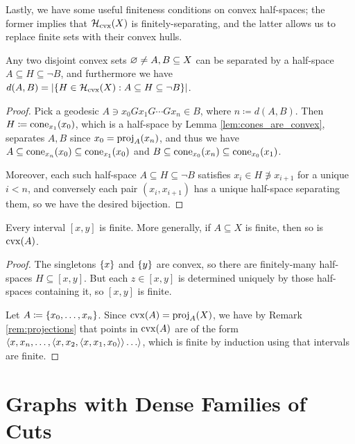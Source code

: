 \documentclass[reqno]{amsart}
\begin{document}
    Lastly, we have some useful finiteness conditions on convex half-spaces; the former implies that $\mc{H}_\mathrm{cvx}(X)$ is finitely-separating, and the latter allows us to replace finite sets with their convex hulls.

    \begin{lemma}\label{lem:half_space_separating_convex}
        Any two disjoint convex sets $\em\neq A,B\subseteq X$ can be separated by a half-space $A\subseteq H\subseteq\lnot B$, and furthermore we have $d(A,B)=|\!\l\{H\in\mc{H}_\mathrm{cvx}(X)\st A\subseteq H\subseteq\lnot B\r\}\!|$.
    \end{lemma}
    \begin{proof}
        Pick a geodesic $A\ni x_0Gx_1G\cdots Gx_n\in B$, where $n\coloneqq d(A,B)$. Then $H\coloneqq\cone_{x_1}(x_0)$, which is a half-space by Lemma \ref{lem:cones_are_convex}, separates $A,B$ since $x_0=\proj_A(x_n)$, and thus we have $A\subseteq\cone_{x_n}(x_0)\subseteq\cone_{x_1}(x_0)$ and $B\subseteq\cone_{x_0}(x_n)\subseteq\cone_{x_0}(x_1)$.

        Moreover, each such half-space $A\subseteq H\subseteq\lnot B$ satisfies $x_i\in H\not\ni x_{i+1}$ for a unique $i<n$, and conversely each pair $(x_i,x_{i+1})$ has a unique half-space separating them, so we have the desired bijection.
    \end{proof}

    \begin{lemma}\label{lem:convex_of_finite_is_finite}
        Every interval $[x,y]$ is finite. More generally, if $A\subseteq X$ is finite, then so is $\cvx(A)$.
    \end{lemma}
    \begin{proof}
        The singletons $\l\{x\r\}$ and $\l\{y\r\}$ are convex, so there are finitely-many half-spaces $H\subseteq[x,y]$. But each $z\in[x,y]$ is determined uniquely by those half-spaces containing it, so $[x,y]$ is finite.

        Let $A\coloneqq\l\{x_0,\dots,x_n\r\}$. Since $\cvx(A)=\proj_A(X)$, we have by Remark \ref{rem:projections} that points in $\cvx(A)$ are of the form $\l\langle x,x_n,\dots,\l\langle x,x_2,\l\langle x,x_1,x_0\r\rangle\r\rangle\dots\r\rangle$, which is finite by induction using that intervals are finite.
    \end{proof}

    \section{Graphs with Dense Families of Cuts}\label{sec:graphs_with_dense_families_of_cuts}
\end{document}
